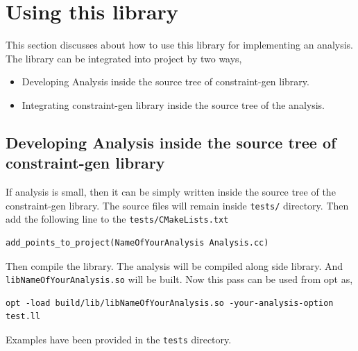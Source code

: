 \documentclass[a4paper,12pt]{report}
\begin{document}
\chapter{Using this library}
This section discusses about how to use this library for implementing an analysis.
The library can be integrated into project by two ways,

\begin{itemize}
    \item Developing Analysis inside the source tree of constraint-gen library.
    \item Integrating constraint-gen library inside the source tree of the analysis.
\end{itemize}

\section{Developing Analysis inside the source tree of constraint-gen library}
If analysis is small, then it can be simply written inside the source tree
of the constraint-gen library. The source files will remain inside \texttt{tests/}
directory. Then add the following line to the \texttt{tests/CMakeLists.txt}

\begin{verbatim}
add_points_to_project(NameOfYourAnalysis Analysis.cc)
\end{verbatim}

Then compile the library. The analysis will be compiled along side library.
And \texttt{libNameOfYourAnalysis.so} will be built. Now this pass can be used
from opt as,

\begin{verbatim}
opt -load build/lib/libNameOfYourAnalysis.so -your-analysis-option test.ll
\end{verbatim}

Examples have been provided in the \texttt{tests} directory.
\end{document}
